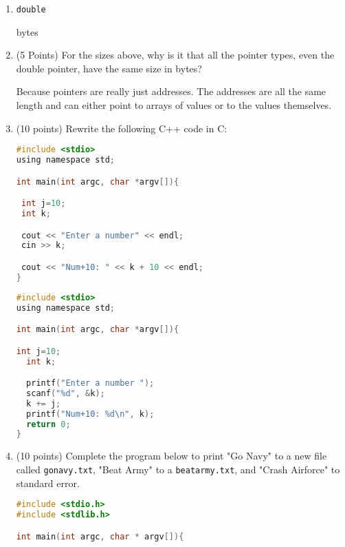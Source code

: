 \documentclass{article}[9pt]
\newenvironment{answerfont}{\fontfamily{qhv}\selectfont}{\par}
\newenvironment{myanswer}{\begin{mdframed}\begin{answerfont}}{\end{answerfont}\end{mdframed}}
\begin{document}
\begin{enumerate}
\begin{enumerate}
\item \texttt{double}

\begin{myanswer}
8 bytes
\end{myanswer}



\item (5 Points) For the sizes above, why is it that all the pointer types, even
the double pointer, have the same size in bytes?


\begin{myanswer}
Because pointers are really just addresses. The addresses are all the same length and can either point to arrays of values or to the values themselves.
\end{myanswer}


\item (10 points) Rewrite the following C++ code in C:

\begin{lstlisting}[language=c]
#include <stdio>
using namespace std;

int main(int argc, char *argv[]){

 int j=10;
 int k;

 cout << "Enter a number" << endl;
 cin >> k;

 cout << "Num+10: " << k + 10 << endl;
}
\end{lstlisting}

\begin{myanswer}
\begin{lstlisting}[language=c]
#include <stdio>
using namespace std;

int main(int argc, char *argv[]){

int j=10;
  int k;

  printf("Enter a number ");
  scanf("%d", &k);
  k += j;
  printf("Num+10: %d\n", k);
  return 0;
}
\end{lstlisting}
\end{myanswer}



\item (10 points) Complete the program below to print "Go Navy" to a new file
called \texttt{gonavy.txt}, "Beat Army" to a \texttt{beatarmy.txt}, and "Crash
Airforce" to standard error.

\begin{lstlisting}[language=c]
#include <stdio.h>
#include <stdlib.h>

int main(int argc, char * argv[]){


\end{lstlisting}
\end{enumerate}
\end{enumerate}
\end{document}
